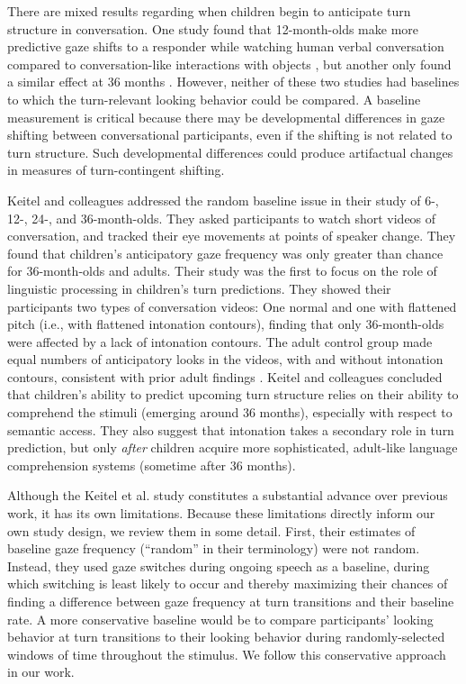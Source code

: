 \documentclass[authoryear, 12pt]{elsarticle}
\begin{document}
There are mixed results regarding when children begin to anticipate turn structure in conversation. One study found that 12-month-olds make more predictive gaze shifts to a responder while watching human verbal conversation compared to conversation-like interactions with objects \citep{bakker2011}, but another only found a similar effect at 36 months \citep{hofsten2009}. However, neither of these two studies had baselines to which the turn-relevant looking behavior could be compared. A baseline measurement is critical because there may be developmental differences in gaze shifting between conversational participants, even if the shifting is not related to turn structure. Such developmental differences could produce artifactual changes in measures of turn-contingent shifting. 

Keitel and colleagues \citeyearpar{keitel2013} addressed the random baseline issue in their study of 6-, 12-, 24-, and 36-month-olds. They asked participants to watch short videos of conversation, and tracked their eye movements at points of speaker change. They found that children's anticipatory gaze frequency was only greater than chance for 36-month-olds and adults. Their study was the first to focus on the role of linguistic processing in children's turn predictions. They showed their participants two types of conversation videos: One normal and one with flattened pitch (i.e., with flattened intonation contours), finding that only 36-month-olds were affected by a lack of intonation contours. The adult control group made equal numbers of anticipatory looks in the videos, with and without intonation contours, consistent with prior adult findings \citep{de-ruiter2006}. Keitel and colleagues concluded that children's ability to predict upcoming turn structure relies on their ability to comprehend the stimuli (emerging around 36 months), especially with respect to semantic access. They also suggest that intonation takes a secondary role in turn prediction, but only \textit{after} children acquire more sophisticated, adult-like language comprehension systems (sometime after 36 months).

Although the Keitel et al. \citeyearpar{keitel2013} study constitutes a substantial advance over previous work, it has its own limitations. Because these limitations directly inform our own study design, we review them in some detail. First, their estimates of baseline gaze frequency (``random'' in their terminology) were not random. Instead, they used gaze switches during ongoing speech as a baseline, during which switching is least likely to occur \citep{hirvenkari2013} and thereby maximizing their chances of finding a difference between gaze frequency at turn transitions and their baseline rate. A more conservative baseline would be to compare participants' looking behavior at turn transitions to their looking behavior during randomly-selected windows of time throughout the stimulus. We follow this conservative approach in our work. 
\end{document}

